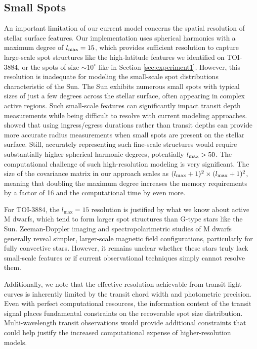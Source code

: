 \documentclass[twocolumn]{aastex631}
\begin{document}
\subsection{Small Spots}
An important limitation of our current model concerns the spatial resolution of stellar surface features. 
Our implementation uses spherical harmonics with a maximum degree of $l_{\rm max}=15$, which provides sufficient 
resolution to capture large-scale spot structures like the high-latitude features we identified on TOI-3884, or the spots of size 
$\sim 10^\circ$ like in Section \ref{sec:experiment1}. 
However, this resolution is inadequate for modeling the small-scale spot distributions characteristic of the Sun.
The Sun exhibits numerous small spots with typical sizes of just a few degrees across the stellar surface, often appearing 
in complex active regions. Such small-scale features can significantly impact transit depth measurements while being difficult 
to resolve with current modeling approaches. \cite{Morrisradius} showed that using ingress/egress durations rather than 
transit depths can provide more accurate radius measurements when small spots are present on the stellar surface.
Still, accurately representing such fine-scale structures would require substantially higher spherical 
harmonic degrees, potentially $l_{\rm max} > 50$. The computational challenge of such high-resolution modeling is very significant. 
The size of the covariance matrix in our approach scales as $(l_{\rm max}+1)^2 \times (l_{\rm max}+1)^2$, meaning that 
doubling the maximum degree increases the memory requirements by a factor of 16 and the computational time by even more.

For TOI-3884, the $l_{\text{max}}=15$ resolution is justified by what we know about active M dwarfs, which tend to form 
larger spot structures than G-type stars like the Sun. Zeeman-Doppler imaging and spectropolarimetric studies of M dwarfs 
generally reveal simpler, larger-scale magnetic field configurations, particularly for fully convective stars. 
However, it remains unclear whether these stars truly lack small-scale features or if current observational techniques 
simply cannot resolve them. 

Additionally, we note that the effective resolution achievable from transit light curves is inherently limited by the transit 
chord width and photometric precision. Even with perfect computational resources, the information content of the transit 
signal places fundamental constraints on the recoverable spot size distribution. Multi-wavelength transit observations 
would provide additional constraints that could help justify the increased computational expense of higher-resolution models.
\end{document}
